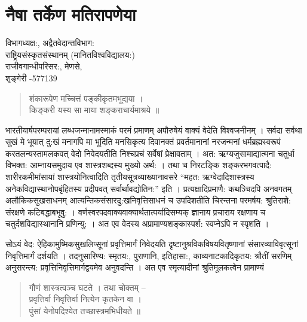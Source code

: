 {\fontsize{15}{17}\selectfont
\chapter{नैषा तर्केण मतिरापणेया}

\begin{center}
\smallskip

विभागध्यक्ष:, अद्वैतवेदान्तविभाग:\\
राष्ट्रियसंस्कृतसंस्थानम् (मानितविश्वविद्यालय:)\\
राजीवगान्धीपरिसर:, मेणसे,\\ 
शृङ्गेरी -577139
\addrule
\end{center}

\begin{verse}
शंकारूपेण मच्चित्तं पङ्कीकृतमभूद्यया ।\\
किङ्करी यस्य सा माया शङ्कराचार्यमाश्रये ॥
\end{verse}

भारतीयार्षपरम्परायां लब्धजन्मानामस्माकं परमं प्रमाणम् अपौरुषेयं वाक्यं वेदेति विश्वजनीनम् । सर्वदा सर्वथा सुखं मे भूयात् दु:खं मनागपि मा  भूदिति मनसिकृत्य दिवानक्तं प्रवर्तमानानां नरजन्मनां धर्मब्रह्मस्वरूपं करतलन्यस्तामलकवत् वेदो निवेदयतीति निश्चप्रचं सर्वेषां प्रेक्षावताम् । अत: ऋग्यजुसामाद्यात्मना चतुर्धा विभक्त: आम्नायसमुदाय एव शास्त्रशब्दस्य मुख्यो अर्थ: । तथा च निरटङ्कि शङ्करभगवत्पादै: शारीरकमीमांसायां शास्त्रयोनित्वादिति तृतीयसूत्रव्याख्यानावसरे “महत: ऋग्वेदादिशास्त्रस्य अनेकविद्यास्थानोपबृंहितस्य प्रदीपवत् सर्वार्थावद्योतिन:” इति । प्रत्यक्षादिप्रमाणै: कथञ्चिदपि अनवगतम् अलौकिकसुखसाधनम् आत्यन्तिकसंसारदु:खनिवृत्तिसाधनं च उपदिशतीति चिरन्तना परमर्षय: श्रुतिराशे: संरक्षणे कटिबद्धाबभूवु: । वर्णस्वरपदवाक्यवाक्यार्थतात्पर्यादिसम्यक् ज्ञानाय प्रचाराय रक्षणाय च चतुर्दशविद्यास्थानानि प्रणिन्यु: । अत एव वेदस्य अप्रामाण्यशङ्कास्पर्श: स्वप्नेऽपि न स्पृशति ।

सोऽयं वेद: ऐहिकामुष्मिकसुखलिप्सूनां प्रवृत्तिमार्गं निवेदयति दृष्टानुश्रविकविषयवितृष्णानां संसारव्याविवृत्सूनां निवृत्तिमार्गं दर्शयति । तदनुसारिण्य: स्मृतय:, पुराणानि, इतिहासा:, काव्यनाटकादिकृतय: श्रौतीं सरणिम् अनुसरन्त्य: प्रवृत्तिनिवृत्तिमार्गद्वयमेव अनुवदन्ति । अत एव स्मृत्यादीनां श्रुतिमूलकत्वेन प्रामाण्यं
\begin{verse}
गौणं शास्त्रत्वञ्च घटते । तथा चोक्तम् –\\
प्रवृत्तिर्वा निवृत्तिर्वा नित्येन कृतकेन वा ।\\
पुंसां येनोपदिश्येत तच्छास्त्रमभिधीयते ॥
\end{verse}

}

